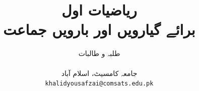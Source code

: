 \documentclass[leqno,b5paper]{book}
\author{
طلبہ و طالبات\\
\\
{\small {جامعہ کامسیٹ، اسلام آباد}}\\
\texttt{khalidyousafzai@comsats.edu.pk}
}
\title{{ریاضیات اول}\small\\ {برائے گیارویں اور بارویں جماعت}}
\date{}                           %
\begin{document}
\sloppy


\renewcommand*{\contentsname}{عنوان}    %
\renewcommand*{\proofname}{ثبوت}   %
\renewcommand*{\appendixname}{ضمیمہ}


\frontmatter                          %

\maketitle

\tableofcontents
\pagestyle{empty}

\newpage


%


\mainmatter                      %
\renewcommand*{\chaptername}{باب}

\pagestyle{headings}


















%



\end{document}
